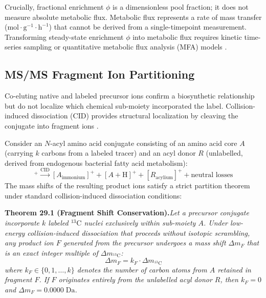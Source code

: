 \documentclass[11pt,twoside,openright]{book}
\begin{document}
Crucially, fractional enrichment $\phi$ is a dimensionless pool fraction; it does not measure absolute metabolic flux. Metabolic flux represents a rate of mass transfer ($\text{mol} \cdot \text{g}^{-1} \cdot \text{h}^{-1}$) that cannot be derived from a single-timepoint measurement. Transforming steady-state enrichment $\phi$ into metabolic flux requires kinetic time-series sampling or quantitative metabolic flux analysis (MFA) models \cite{buescher2015roadmap}.

\subsection{MS/MS Fragment Ion Partitioning}

Co-eluting native and labeled precursor ions confirm a biosynthetic relationship but do not localize which chemical sub-moiety incorporated the label. Collision-induced dissociation (CID) provides structural localization by cleaving the conjugate into fragment ions \cite{hsieh2026aromatic}.

Consider an $N$-acyl amino acid conjugate consisting of an amino acid core $A$ (carrying $k$ carbons from a labeled tracer) and an acyl donor $R$ (unlabelled, derived from endogenous bacterial fatty acid metabolism):
\begin{equation}
[\text{Acyl-AA} + \text{H}]^+ \xrightarrow{\text{CID}} [A_{\text{immonium}}]^+ + [A + \text{H}]^+ + [R_{\text{acylium}}]^+ + \text{neutral losses}
\end{equation}
The mass shifts of the resulting product ions satisfy a strict partition theorem under standard collision-induced dissociation conditions:

\vspace{0.6em}
\noindent\textbf{Theorem 29.1 (Fragment Shift Conservation).}\enspace\textit{Let a precursor conjugate incorporate $k$ labeled $^{13}\text{C}$ nuclei exclusively within sub-moiety $A$. Under low-energy collision-induced dissociation that proceeds without isotopic scrambling, any product ion $F$ generated from the precursor undergoes a mass shift $\Delta m_F$ that is an exact integer multiple of $\Delta m_{^{13}\text{C}}$:
\begin{equation}
\Delta m_F = k_F \cdot \Delta m_{^{13}\text{C}}
\end{equation}
where $k_F \in \{0, 1, \dots, k\}$ denotes the number of carbon atoms from $A$ retained in fragment $F$. If $F$ originates entirely from the unlabelled acyl donor $R$, then $k_F = 0$ and $\Delta m_F = 0.0000\;\text{Da}$.}
\end{document}

